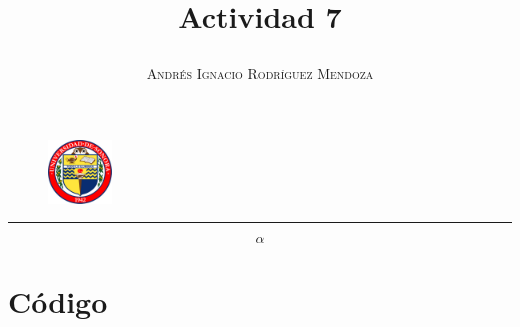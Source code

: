\documentclass[11pt,spanish]{article}
\title{\vspace{-3cm}\begin{flushleft}\textbf{Actividad 7}\end{flushleft}}
\author{\hspace{-9.6cm}\textsc{Andrés Ignacio Rodríguez Mendoza}}
\date{}
\begin{document}
\begin{figure}
  \begin{center}
   \vspace{-5.4cm} \includegraphics[width=0.15\textwidth]{uni}
  \end{center}
\end{figure}

\maketitle  
\begin{center}
\rule{\textwidth}{1pt}
\end{center}

$$\alpha$$

\section*{Código}
\end{document}
